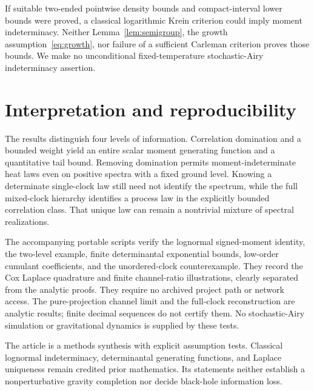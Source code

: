 \documentclass[11pt,a4paper]{article}
\theoremstyle{remark}\newtheorem{remark}[theorem]{Remark}
\begin{document}
If suitable two-ended pointwise density bounds and compact-interval lower bounds were proved, a classical logarithmic Krein criterion could imply moment indeterminacy.
Neither Lemma~\ref{lem:semigroup}, the growth assumption~\eqref{eq:growth}, nor failure of a sufficient Carleman criterion proves those bounds.
We make no unconditional fixed-temperature stochastic-Airy indeterminacy assertion.

\section{Interpretation and reproducibility}
The results distinguish four levels of information.
Correlation domination and a bounded weight yield an entire scalar moment generating function and a quantitative tail bound.
Removing domination permits moment-indeterminate heat laws even on positive spectra with a fixed ground level.
Knowing a determinate single-clock law still need not identify the spectrum, while the full mixed-clock hierarchy identifies a process law in the explicitly bounded correlation class.
That unique law can remain a nontrivial mixture of spectral realizations.

The accompanying portable scripts verify the lognormal signed-moment identity, the two-level example, finite determinantal exponential bounds, low-order cumulant coefficients, and the unordered-clock counterexample.
They record the Cox Laplace quadrature and finite channel-ratio illustrations, clearly separated from the analytic proofs.
They require no archived project path or network access.
The pure-projection channel limit and the full-clock reconstruction are analytic results; finite decimal sequences do not certify them.
No stochastic-Airy simulation or gravitational dynamics is supplied by these tests.

The article is a methods synthesis with explicit assumption tests.
Classical lognormal indeterminacy, determinantal generating functions, and Laplace uniqueness remain credited prior mathematics.
Its statements neither establish a nonperturbative gravity completion nor decide black-hole information loss.
\end{document}
